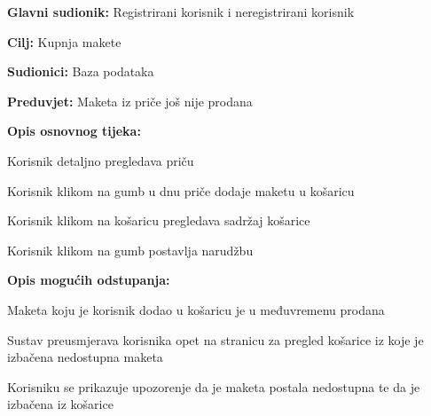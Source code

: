 					\noindent {}
					\begin{packed_item}
						
						\item \textbf{Glavni sudionik: }Registrirani korisnik i neregistrirani korisnik
						\item  \textbf{Cilj:} Kupnja makete
						\item  \textbf{Sudionici:} Baza podataka
						\item  \textbf{Preduvjet:} Maketa iz priče još nije prodana
						\item  \textbf{Opis osnovnog tijeka:}
						
						\item[] \begin{packed_enum}
							\item Korisnik detaljno pregledava priču
							\item Korisnik klikom na gumb u dnu priče dodaje maketu u košaricu
							\item Korisnik klikom na košaricu pregledava sadržaj košarice
							\item Korisnik klikom na gumb postavlja narudžbu
						\end{packed_enum}
					
					\item  \textbf{Opis mogućih odstupanja:}
					
					\item[] \begin{packed_item}
						
						\item[4.a] Maketa koju je korisnik dodao u košaricu je u međuvremenu prodana
						\item[] \begin{packed_enum}
							
							\item Sustav preusmjerava korisnika opet na stranicu za pregled košarice iz koje je izbačena nedostupna maketa
							\item Korisniku se prikazuje upozorenje da je maketa postala nedostupna te da je izbačena iz košarice
							
						\end{packed_enum}
						
					\end{packed_item}
					
						
					\end{packed_item}
				
